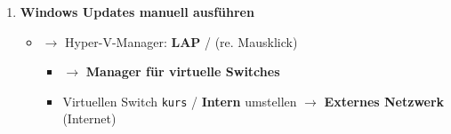 \begin{enumerate}
\begin{itemize}
    \begin{itemize}
    \item
      Benutzerdefiniert
    \item
      Elemente auswählen: \verb|Daten| (Ordner)
    \item
      Sicherungszeit: \verb|21:00|,
      \verb|Einmal pro Tag|
    \item
      Sicherung auf einem freigegeben Netzwerkordner erstellen
    \item
      Pfad: \verb|\\server01\Backup|
    \item
      \textbf{Berechtigung für das planen der Sicherung} user:
      \verb|pagr\administrator| key:
    \end{itemize}
  \item
    Suche: Aufgabenplanung (Ergänzen)
  \end{itemize}
\item
  \textbf{Windows Updates manuell ausführen}

  \begin{itemize}
  \item
    $\to$ Hyper-V-Manager: \textbf{LAP} / (re. Mausklick)

    \begin{itemize}
    \item
      $\to$ \textbf{Manager für virtuelle Switches}
    \item
      Virtuellen Switch \verb|kurs| / \textbf{Intern}
      umstellen $\to$ \textbf{Externes Netzwerk} (Internet)
    \end{itemize}
  \end{itemize}
\end{enumerate}
